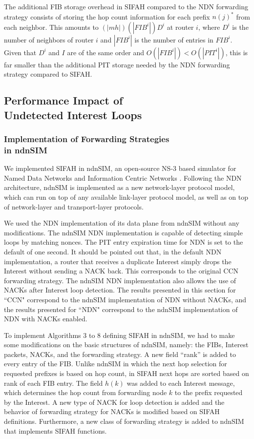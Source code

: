\documentclass{ancs15-alternate}
\begin{document}
The additional FIB storage overhead  in SIFAH compared to the NDN forwarding strategy consists of storing the hop count information for each prefix $n(j)^*$ from each neighbor. This amounts to $ (|mh|)(  |FIB^i|)D^i$ at router $i$, where $D^i$ is the  number of neighbors of router $i$ and 
$|FIB^i|$ is the number of entries in $FIB^i$. Given that $D^i$ and $I$ are of the same order and $O(|FIB^i|) < O(|PIT^i|)$, this  is far smaller than the additional PIT storage needed by the NDN forwarding strategy compared to SIFAH.

\subsection{Performance Impact of \\Undetected Interest Loops }

\subsubsection{ Implementation of Forwarding Strategies \\in ndnSIM}

We implemented SIFAH in ndnSIM,   an open-source NS-3 based simulator for Named Data Networks and Information Centric Networks \cite{ndnSIM}. Following the NDN architecture, ndnSIM is implemented as a new network-layer protocol model, which can run on top of any available link-layer protocol model, as well as on top of network-layer and transport-layer protocols. 

We used the NDN implementation of its data plane from ndnSIM without any modifications.
The ndnSIM NDN implementation  is capable of detecting simple loops by matching nonces.
The PIT entry expiration time for NDN is set to the default of one second.  It should be pointed out that, in the default NDN implementation, a router that receives a duplicate Interest simply drops the Interest without sending a NACK back. This corresponds to the original CCN forwarding strategy. The ndnSIM NDN implementation also allows the use of NACKs after Interest loop detection. The results presented in this section for  ``CCN" correspond to the ndnSIM implementation of NDN without NACKs, and the results presented for  ``NDN" correspond to the ndnSIM implementation of NDN with NACKs enabled. 

To implement Algorithms 3 to 8 defining SIFAH in ndnSIM, we had to make some modifications on the basic structures of ndnSIM, namely:  the FIBs, Interest packets, NACKs, and the forwarding strategy. 
A new field ``rank'' is added to every entry of the FIB. Unlike ndnSIM in which the next hop selection for requested prefixes is based on hop count, in SIFAH next hops are sorted based on rank of each FIB entry.  
The field $h(k)$ was added to each Interest message, which determines the hop count from forwarding node $k$ to the prefix requested by the Interest. 
A new type of NACK for loop detection is added and the behavior of forwarding strategy for NACKs is modified based on SIFAH definitions. Furthermore, a new class of forwarding strategy is added to ndnSIM that implements SIFAH functions.
 
\end{document}
